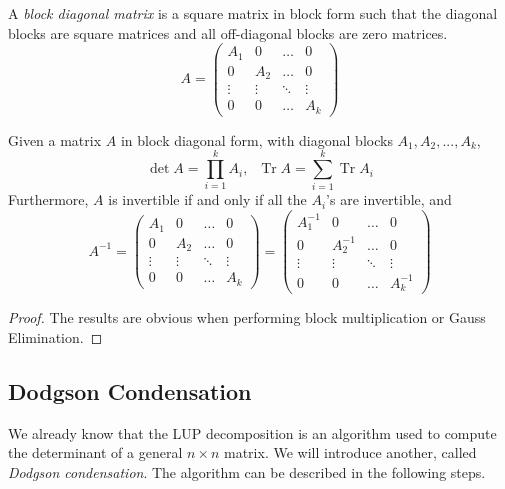 \documentclass{article}
\DeclareMathOperator{\Tr}{Tr}
\begin{document}
    \begin{definition}
    A \textit{block diagonal matrix} is a square matrix in block form such that the diagonal blocks are square matrices and all off-diagonal blocks are zero matrices. 
    \[A = \begin{pmatrix}
    A_1&0&\ldots&0\\
    0&A_2&\ldots&0\\
    \vdots&\vdots&\ddots&\vdots\\
    0&0&\ldots&A_k
    \end{pmatrix}\]
    \end{definition}

    \begin{theorem}
    Given a matrix $A$ in block diagonal form, with diagonal blocks $A_1, A_2, ..., A_k$,
    \[\det{A} = \prod_{i=1}^k A_i, \; \; \Tr{A} = \sum_{i=1}^k \Tr{A_i}\]
    Furthermore, $A$ is invertible if and only if all the $A_i$'s are invertible, and 
    \[A^{-1} = \begin{pmatrix}
    A_1&0&\ldots&0\\
    0&A_2&\ldots&0\\
    \vdots&\vdots&\ddots&\vdots\\
    0&0&\ldots&A_k
    \end{pmatrix} = \begin{pmatrix}
    A_1^{-1}&0&\ldots&0\\
    0&A_2^{-1}&\ldots&0\\
    \vdots&\vdots&\ddots&\vdots\\
    0&0&\ldots&A_k^{-1}
    \end{pmatrix}\]
    \end{theorem}
    \begin{proof}
    The results are obvious when performing block multiplication or Gauss Elimination. 
    \end{proof}

  \subsection{Dodgson Condensation}

    We already know that the LUP decomposition is an algorithm used to compute the determinant of a general $n \times n$ matrix. We will introduce another, called \textit{Dodgson condensation}. The algorithm can be described in the following steps.
\end{document}
